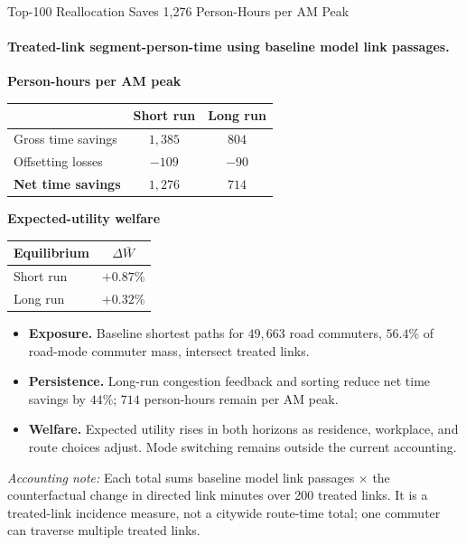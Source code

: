 \documentclass[11pt,aspectratio=169]{beamer}
\newcommand{\good}[1]{\textcolor{blue!70!black}{#1}}
\newcommand{\bad}[1]{\textcolor{red!70!black}{#1}}
\begin{document}
\begin{frame}[label=result2]{Top-100 Reallocation Saves 1,276 Person-Hours per AM Peak}
\framesubtitle{Treated-link segment-person-time using baseline model link passages.}
\centering
\begin{minipage}[t]{0.60\textwidth}
\centering
\small\textbf{Person-hours per AM peak}\par
\vspace{0.35em}
\scriptsize
\renewcommand{\arraystretch}{1.18}
\setlength{\tabcolsep}{7pt}
\begin{tabular}{lcc}
\toprule
 & Short run & Long run \\
\midrule
Gross time savings & $1{,}385$ & $804$ \\
Offsetting losses & \bad{$-109$} & \bad{$-90$} \\
\midrule
\textbf{Net time savings} & \good{\textbf{$1{,}276$}} & \good{\textbf{$714$}} \\
\bottomrule
\end{tabular}
\end{minipage}\hfill
\begin{minipage}[t]{0.31\textwidth}
\centering
\small\textbf{Expected-utility welfare}\par
\vspace{0.35em}
\scriptsize
\begin{tabular}{lc}
\toprule
Equilibrium & $\Delta\bar W$ \\
\midrule
Short run & \good{$+0.87\%$} \\
Long run & \good{$+0.32\%$} \\
\bottomrule
\end{tabular}
\end{minipage}

\vspace{0.65em}
\begin{itemize}\footnotesize\setlength\itemsep{0.35em}
  \item \textbf{Exposure.} Baseline shortest paths for \good{$49{,}663$ road commuters}, \good{$56.4\%$} of road-mode commuter mass, intersect treated links.
  \item \textbf{Persistence.} Long-run congestion feedback and sorting reduce net time savings by $44\%$; \good{$714$ person-hours} remain per AM peak.
  \item \textbf{Welfare.} Expected utility rises in both horizons as residence, workplace, and route choices adjust. Mode switching remains outside the current accounting.
\end{itemize}
\vspace{0.15em}
{\tiny\raggedright\textit{Accounting note:} Each total sums baseline model link passages $\times$ the counterfactual change in directed link minutes over 200 treated links. It is a treated-link incidence measure, not a citywide route-time total; one commuter can traverse multiple treated links.\par}
\end{frame}
\end{document}
